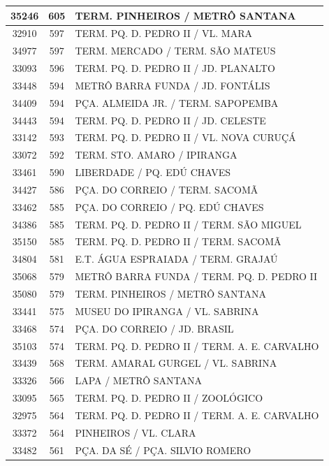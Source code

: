 \documentclass[
	12pt,				%
	oneside,			%
	a4paper,			%
	english,			%
	brazil				%
	]{abntex2ppgsi}
\begin{document}
{{\begin{apendicesenv}
\begin{longtable}{c|c|p{7cm}}
 \hline 
35246 &	605 &	TERM. PINHEIROS / METRÔ SANTANA \\ 
 \hline 
32910 &	597 &	TERM. PQ. D. PEDRO II / VL. MARA \\ 
 \hline 
34977 &	597 &	TERM. MERCADO / TERM. SÃO MATEUS \\ 
 \hline 
33093 &	596 &	TERM. PQ. D. PEDRO II / JD. PLANALTO \\ 
 \hline 
33448 &	594 &	METRÔ BARRA FUNDA / JD. FONTÁLIS \\ 
 \hline 
34409 &	594 &	PÇA. ALMEIDA JR. / TERM. SAPOPEMBA \\ 
 \hline 
34443 &	594 &	TERM. PQ. D. PEDRO II / JD. CELESTE \\ 
 \hline 
33142 &	593 &	TERM. PQ. D. PEDRO II / VL. NOVA CURUÇÁ \\ 
 \hline 
33072 &	592 &	TERM. STO. AMARO / IPIRANGA \\ 
 \hline 
33461 &	590 &	LIBERDADE / PQ. EDÚ CHAVES \\ 
 \hline 
34427 &	586 &	PÇA. DO CORREIO / TERM. SACOMÃ \\ 
 \hline 
33462 &	585 &	PÇA. DO CORREIO / PQ. EDÚ CHAVES \\ 
 \hline 
34386 &	585 &	TERM. PQ. D. PEDRO II / TERM. SÃO MIGUEL \\ 
 \hline 
35150 &	585 &	TERM. PQ. D. PEDRO II / TERM. SACOMÃ \\ 
 \hline 
34804 &	581 &	E.T. ÁGUA ESPRAIADA / TERM. GRAJAÚ \\ 
 \hline 
35068 &	579 &	METRÔ BARRA FUNDA / TERM. PQ. D. PEDRO II \\ 
 \hline 
35080 &	579 &	TERM. PINHEIROS / METRÔ SANTANA \\ 
 \hline 
33441 &	575 &	MUSEU DO IPIRANGA / VL. SABRINA \\ 
 \hline 
33468 &	574 &	PÇA. DO CORREIO / JD. BRASIL \\ 
 \hline 
35103 &	574 &	TERM. PQ. D. PEDRO II / TERM. A. E. CARVALHO \\ 
 \hline 
33439 &	568 &	TERM. AMARAL GURGEL / VL. SABRINA \\ 
 \hline 
33326 &	566 &	LAPA / METRÔ SANTANA \\ 
 \hline 
33095 &	565 &	TERM. PQ. D. PEDRO II / ZOOLÓGICO \\ 
 \hline 
32975 &	564 &	TERM. PQ. D. PEDRO II / TERM. A. E. CARVALHO \\ 
 \hline 
33372 &	564 &	PINHEIROS / VL. CLARA \\ 
 \hline 
33482 &	561 &	PÇA. DA SÉ / PÇA. SILVIO ROMERO \\ 

\end{longtable}
\end{apendicesenv}}}
\end{document}

